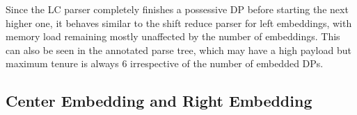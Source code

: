 Since the LC parser completely finishes a possessive DP before starting the next higher one, it behaves similar to the shift reduce parser for left embeddings, with memory load remaining mostly unaffected by the number of embeddings.
This can also be seen in the annotated parse tree, which may have a high payload but maximum tenure is always $6$ irrespective of the number of embedded DPs.
%
\begin{center}
    \footnotesize
\end{center}

\subsection{Center Embedding and Right Embedding}

